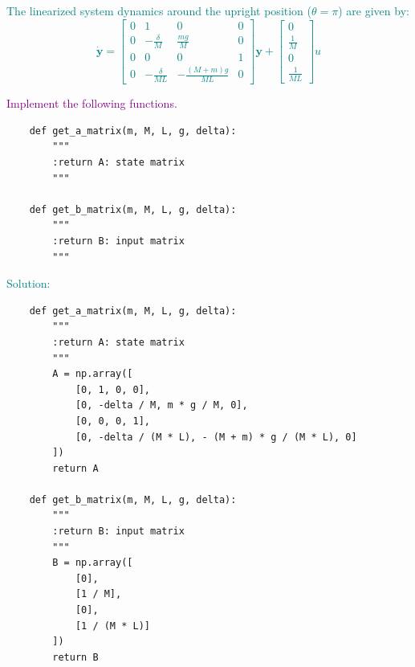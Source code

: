 \documentclass[a4 paper]{article}
\begin{document}
\textcolor{teal}{
    The linearized system dynamics around the upright position (\(\theta = \pi\)) are given by:
    \begin{equation*}
        \dot{\mathbf{y}} = \begin{bmatrix}
            0 & 1 & 0 & 0 \\
            0 & -\frac{\delta}{M} & \frac{m g}{M} & 0 \\
            0 & 0 & 0 & 1 \\
            0 & -\frac{\delta}{M L} & - \frac{(M + m) g}{M L} & 0
        \end{bmatrix} \mathbf{y} + 
        \begin{bmatrix}
            0 \\
            \frac{1}{M} \\
            0 \\
            \frac{1}{M L}
        \end{bmatrix} u
    \end{equation*}
}

\bigbreak

\textcolor{purple}{
     Implement the following functions.
}

\begin{verbatim}
    def get_a_matrix(m, M, L, g, delta):
        """
        :return A: state matrix
        """

    def get_b_matrix(m, M, L, g, delta):
        """
        :return B: input matrix
        """
\end{verbatim}

\medbreak

\textcolor{teal}{
    Solution:
}

\begin{verbatim}
    def get_a_matrix(m, M, L, g, delta):
        """
        :return A: state matrix
        """
        A = np.array([
            [0, 1, 0, 0],
            [0, -delta / M, m * g / M, 0],
            [0, 0, 0, 1],
            [0, -delta / (M * L), - (M + m) * g / (M * L), 0]
        ])
        return A

    def get_b_matrix(m, M, L, g, delta):
        """
        :return B: input matrix
        """
        B = np.array([
            [0],
            [1 / M],
            [0],
            [1 / (M * L)]
        ])
        return B
\end{verbatim}


\end{document}
